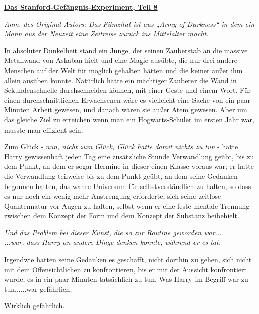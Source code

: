 

\hypertarget{das-stanford-gefuxe4ngnis-experiment-teil-8}{%

\textbf{\uline{Das Stanford-Gefängnis-Experiment, Teil 8}}

\hfill\break \emph{Anm. des Original Autors: Das Filmzitat ist aus „Army of Darkness“ in dem ein Mann aus der Neuzeit eine Zeitreise zurück ins Mittelalter macht.}

In absoluter Dunkelheit stand ein Junge, der seinen Zauberstab an die massive Metallwand von Askaban hielt und eine Magie ausübte, die nur drei andere Menschen auf der Welt für möglich gehalten hätten und die keiner außer ihm allein ausüben konnte. Natürlich hätte ein mächtiger Zauberer die Wand in Sekundenschnelle durchschneiden können, mit einer Geste und einem Wort. Für einen durchschnittlichen Erwachsenen wäre es vielleicht eine Sache von ein paar Minuten Arbeit gewesen, und danach wären sie außer Atem gewesen. Aber um das gleiche Ziel zu erreichen wenn man ein Hogwarts-Schüler im ersten Jahr war, musste man effizient sein.

Zum Glück - \emph{nun, nicht zum Glück, Glück hatte damit nichts zu tun} - hatte Harry gewissenhaft jeden Tag eine zusätzliche Stunde Verwandlung geübt, bis zu dem Punkt, an dem er sogar Hermine in dieser einen Klasse voraus war; er hatte die Verwandlung teilweise bis zu dem Punkt geübt, an dem seine Gedanken begonnen hatten, das wahre Universum für selbstverständlich zu halten, so dass es nur noch ein wenig mehr Anstrengung erforderte, sich seine zeitlose Quantennatur vor Augen zu halten, selbst wenn er eine feste mentale Trennung zwischen dem Konzept der Form und dem Konzept der Substanz beibehielt.

\emph{Und das Problem bei dieser Kunst, die so zur Routine geworden war...}\\ \emph{...war, dass Harry an andere Dinge denken konnte, während er es tat.}

Irgendwie hatten seine Gedanken es geschafft, nicht dorthin zu gehen, sich nicht mit dem Offensichtlichen zu konfrontieren, bis er mit der Aussicht konfrontiert wurde, es in ein paar Minuten tatsächlich zu tun. Was Harry im Begriff war zu tun......war gefährlich.

Wirklich gefährlich.

}
